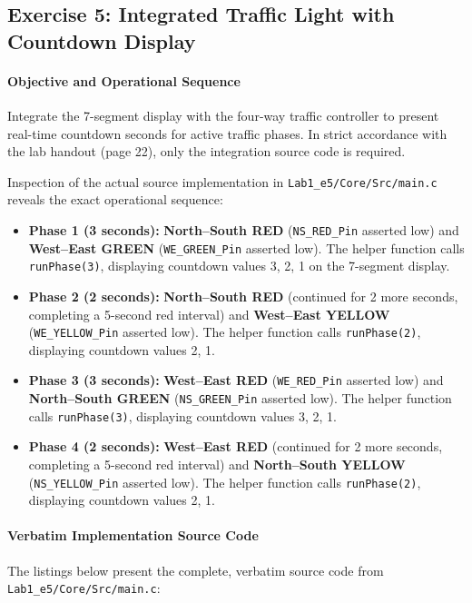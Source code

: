 \documentclass[oneside,final]{hcmut-report}
\begin{document}
\subsection{Exercise 5: Integrated Traffic Light with Countdown Display}
\label{subsec:ex5}
\paragraph{Objective and Operational Sequence}
Integrate the 7-segment display with the four-way traffic controller to present real-time countdown seconds for active traffic phases. In strict accordance with the lab handout (page 22), only the integration source code is required.

Inspection of the actual source implementation in \texttt{Lab1\_e5/Core/Src/main.c} reveals the exact operational sequence:
\begin{itemize}[leftmargin=*,itemsep=1pt]
  \item \textbf{Phase 1 (3 seconds):} \textbf{North--South RED} (\texttt{NS\_RED\_Pin} asserted low) and \textbf{West--East GREEN} (\texttt{WE\_GREEN\_Pin} asserted low). The helper function calls \texttt{runPhase(3)}, displaying countdown values 3, 2, 1 on the 7-segment display.
  \item \textbf{Phase 2 (2 seconds):} \textbf{North--South RED} (continued for 2 more seconds, completing a 5-second red interval) and \textbf{West--East YELLOW} (\texttt{WE\_YELLOW\_Pin} asserted low). The helper function calls \texttt{runPhase(2)}, displaying countdown values 2, 1.
  \item \textbf{Phase 3 (3 seconds):} \textbf{West--East RED} (\texttt{WE\_RED\_Pin} asserted low) and \textbf{North--South GREEN} (\texttt{NS\_GREEN\_Pin} asserted low). The helper function calls \texttt{runPhase(3)}, displaying countdown values 3, 2, 1.
  \item \textbf{Phase 4 (2 seconds):} \textbf{West--East RED} (continued for 2 more seconds, completing a 5-second red interval) and \textbf{North--South YELLOW} (\texttt{NS\_YELLOW\_Pin} asserted low). The helper function calls \texttt{runPhase(2)}, displaying countdown values 2, 1.
\end{itemize}

\paragraph{Verbatim Implementation Source Code}
The listings below present the complete, verbatim source code from \texttt{Lab1\_e5/Core/Src/main.c}:
\end{document}
